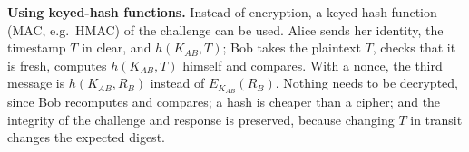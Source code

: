 \textbf{Using keyed-hash functions.} Instead of encryption, a keyed-hash function (MAC, e.g.\ HMAC) of the challenge can be used. Alice sends her identity, the timestamp $T$ in clear, and $h(K_{AB}, T)$; Bob takes the plaintext $T$, checks that it is fresh, computes $h(K_{AB}, T)$ himself and compares. With a nonce, the third message is $h(K_{AB}, R_B)$ instead of $E_{K_{AB}}(R_B)$. Nothing needs to be decrypted, since Bob recomputes and compares; a hash is cheaper than a cipher; and the integrity of the challenge and response is preserved, because changing $T$ in transit changes the expected digest.
\begin{center}
\end{center}

